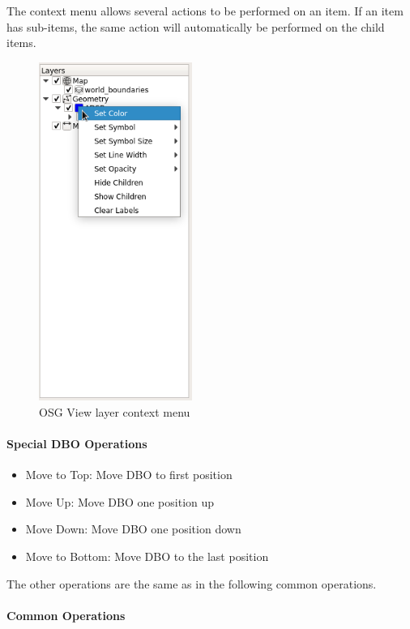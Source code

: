 {The context menu allows several actions to be performed on an item. If an item has sub-items, the same action will automatically be performed on the child items.

\begin{figure}[H]
    \includegraphics[width=5cm,frame]{../screenshots/osgview_layer_context_menu.png}
  \caption{OSG View layer context menu}
\end{figure}

\paragraph{Special DBO Operations}

\begin{itemize}
 \item Move to Top: Move DBO to first position
 \item Move Up: Move DBO one position up
 \item Move Down: Move DBO one position down
 \item Move to Bottom: Move DBO to the last position
\end{itemize}

The other operations are the same as in the following common operations.

\paragraph{Common Operations}

}
